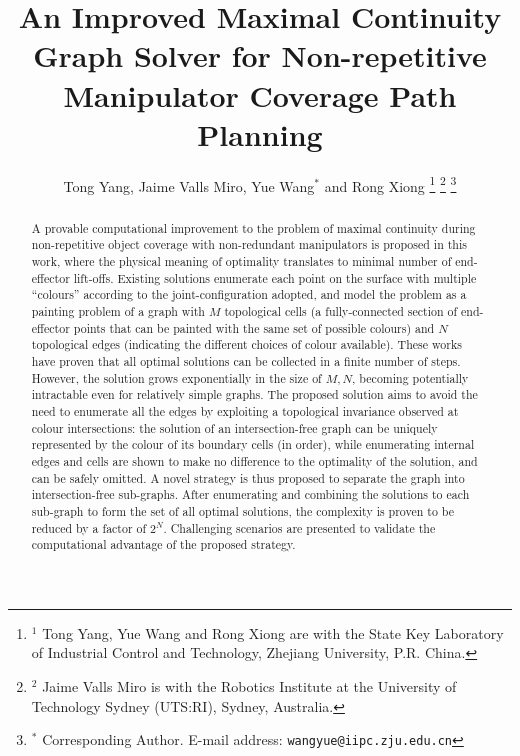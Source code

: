 \documentclass[journal]{IEEEtran}
\begin{document}
\title{An Improved Maximal Continuity Graph Solver for Non-repetitive Manipulator Coverage Path Planning}

\author{Tong Yang, Jaime Valls Miro, Yue Wang$^*$ and Rong Xiong
\thanks{$^1$ Tong Yang, Yue Wang and Rong Xiong are with the State Key 
Laboratory of Industrial Control and Technology, Zhejiang University, P.R. China. 
}
\thanks{$^2$ Jaime Valls Miro is with the Robotics Institute at the University of Technology Sydney (UTS:RI), Sydney, Australia.}
\thanks{$^*$ Corresponding Author. \newline \indent
E-mail address: {\tt\small wangyue@iipc.zju.edu.cn}}
}

\maketitle

\begin{abstract}
A provable computational improvement to the problem of maximal continuity during non-repetitive object coverage with non-redundant manipulators is proposed in this work, where the physical meaning of optimality translates to minimal number of end-effector lift-offs. Existing solutions enumerate each point on the surface with multiple ``colours'' according to the joint-configuration adopted, and model the problem as a painting problem of a graph with $M$ topological cells (a fully-connected section of end-effector points that can be painted with the same set of possible colours) and $N$ topological edges
(indicating the different choices of colour available). 
These works have proven that all optimal solutions can be collected in a finite number of steps. However, the solution grows exponentially in the size of $M, N$, becoming potentially intractable even for relatively simple graphs.
The proposed solution aims to avoid the need to enumerate all 
the edges by exploiting a topological invariance observed at colour intersections: 
the solution of an intersection-free graph can be uniquely represented by the colour of its boundary cells (in order), while enumerating internal edges and cells 
are shown to make no difference to the optimality of the solution, and can be safely omitted. 
A novel strategy is thus proposed to separate the graph into intersection-free sub-graphs.  
After enumerating and combining the solutions to each sub-graph to form the set of all optimal solutions, 
the complexity is proven to be reduced by a factor of $2^N$. Challenging scenarios are presented to validate the computational advantage of the proposed strategy.
\end{abstract}
\end{document}
